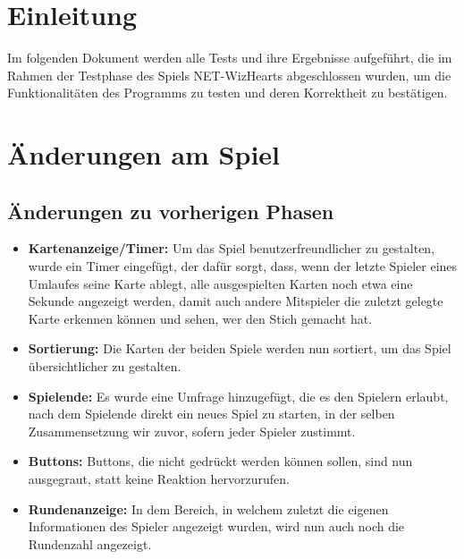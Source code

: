 \documentclass[a4paper]{article}
\begin{document}
\newpage
 
\section{Einleitung}
Im folgenden Dokument werden alle Tests und ihre Ergebnisse aufgeführt, die im Rahmen der Testphase des Spiels NET-WizHearts abgeschlossen wurden, um die Funktionalitäten des Programms zu testen und deren Korrektheit zu bestätigen.

\section{Änderungen am Spiel}
\subsection{Änderungen zu vorherigen Phasen}
	\begin{itemize}
	\item \textbf{Kartenanzeige/Timer:} Um das Spiel benutzerfreundlicher zu gestalten, wurde ein Timer eingefügt, der dafür sorgt, dass, wenn der letzte Spieler eines Umlaufes seine Karte ablegt, alle ausgespielten Karten noch etwa eine Sekunde angezeigt werden, damit auch andere Mitspieler die zuletzt gelegte Karte erkennen können und sehen, wer den Stich gemacht hat.
	\item \textbf{Sortierung:} Die Karten der beiden Spiele werden nun sortiert, um das Spiel übersichtlicher zu gestalten.
	\item \textbf{Spielende:} Es wurde eine Umfrage hinzugefügt, die es den Spielern erlaubt, nach dem Spielende direkt ein neues 		Spiel zu starten, in der selben Zusammensetzung wir zuvor, sofern jeder Spieler zustimmt.
	\item \textbf{Buttons:} Buttons, die nicht gedrückt werden können sollen, sind nun ausgegraut, statt keine Reaktion 			hervorzurufen.
	\item \textbf{Rundenanzeige:} In dem Bereich, in welchem zuletzt die eigenen Informationen des Spieler angezeigt wurden, wird 		nun auch noch die Rundenzahl angezeigt.
	\end{itemize}
	
\end{document}
